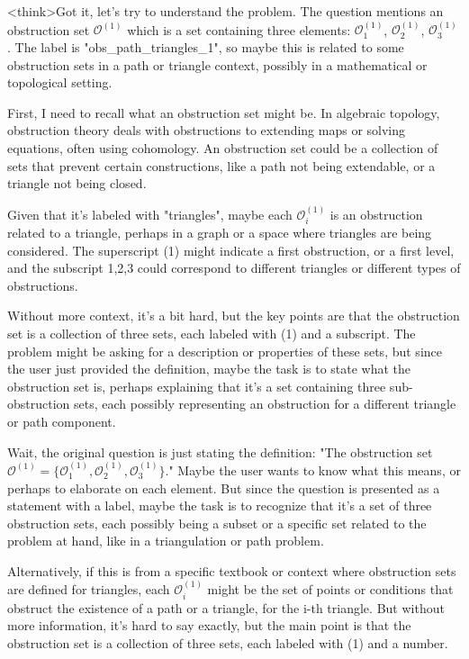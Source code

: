 <think>Got it, let's try to understand the problem. The question mentions an obstruction set $\mathcal{O}^{(1)}$ which is a set containing three elements: $\mathcal{O}^{(1)}_1$, $\mathcal{O}^{(1)}_2$, $\mathcal{O}^{(1)}_3$. The label is "obs_path_triangles_1", so maybe this is related to some obstruction sets in a path or triangle context, possibly in a mathematical or topological setting. 

First, I need to recall what an obstruction set might be. In algebraic topology, obstruction theory deals with obstructions to extending maps or solving equations, often using cohomology. An obstruction set could be a collection of sets that prevent certain constructions, like a path not being extendable, or a triangle not being closed. 

Given that it's labeled with "triangles", maybe each $\mathcal{O}^{(1)}_i$ is an obstruction related to a triangle, perhaps in a graph or a space where triangles are being considered. The superscript (1) might indicate a first obstruction, or a first level, and the subscript 1,2,3 could correspond to different triangles or different types of obstructions. 

Without more context, it's a bit hard, but the key points are that the obstruction set is a collection of three sets, each labeled with (1) and a subscript. The problem might be asking for a description or properties of these sets, but since the user just provided the definition, maybe the task is to state what the obstruction set is, perhaps explaining that it's a set containing three sub-obstruction sets, each possibly representing an obstruction for a different triangle or path component. 

Wait, the original question is just stating the definition: "The obstruction set $\mathcal{O}^{(1)}=\big\{\mathcal{O}^{(1)}_1,\mathcal{O}^{(1)}_2,\mathcal{O}^{(1)}_3\big\}$." Maybe the user wants to know what this means, or perhaps to elaborate on each element. But since the question is presented as a statement with a label, maybe the task is to recognize that it's a set of three obstruction sets, each possibly being a subset or a specific set related to the problem at hand, like in a triangulation or path problem. 

Alternatively, if this is from a specific textbook or context where obstruction sets are defined for triangles, each $\mathcal{O}^{(1)}_i$ might be the set of points or conditions that obstruct the existence of a path or a triangle, for the i-th triangle. But without more information, it's hard to say exactly, but the main point is that the obstruction set is a collection of three sets, each labeled with (1) and a number. 


